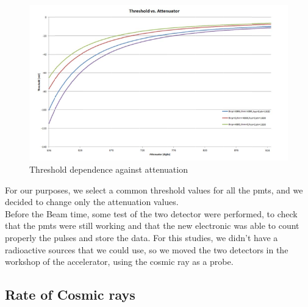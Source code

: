 \begin{figure}[hbtp]
 \centering
 \includegraphics[scale=0.4]{Analysis/ThrvsAtt.png}
 \caption{Threshold dependence against attenuation}
 \end{figure}

For our purposes, we select a common threshold values for all the pmts, and we decided to change only the attenuation values.\\
Before the Beam time, some test of the two detector were performed, to check that the pmts were still working and that the new electronic was able to count properly the pulses and store the data. For this studies, we didn't have a radioactive sources that we could use, so we moved the two detectors in the workshop of the accelerator, using the cosmic ray as a probe.

\subsection{Rate of Cosmic rays}


